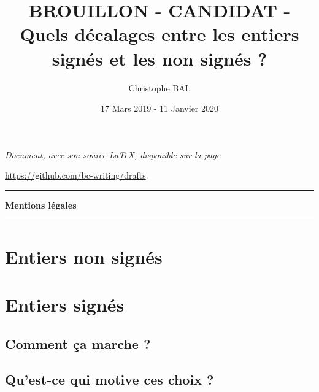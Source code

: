 \documentclass[12pt]{amsart}
\begin{document}
\title{BROUILLON - CANDIDAT - Quels décalages entre les entiers signés et les non signés ?}
\author{Christophe BAL}
\date{17 Mars 2019 - 11 Janvier 2020}

\maketitle

\begin{center}
	\itshape
	Document, avec son source \LaTeX, disponible sur la page
	
	\url{https://github.com/bc-writing/drafts}.
\end{center}


\bigskip


\begin{center}
	\hrule\vspace{.3em}
	{
		\fontsize{1.35em}{1em}\selectfont
		\textbf{Mentions \og légales \fg}
	}
			
	\vspace{0.45em}
	\doclicenseThis
	\hrule
\end{center}

	
\bigskip
\setcounter{tocdepth}{2}
\tableofcontents





\section{Entiers non signés}






\section{Entiers signés}

\subsection{Comment ça marche ?}




\subsection{Qu'est-ce qui motive ces choix ?}


\end{document}
